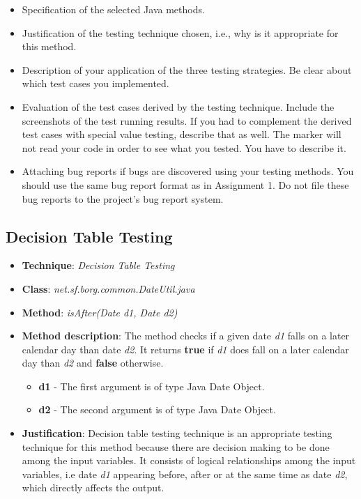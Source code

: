 \documentclass[fontsize=12pt,paper=letter,twoside]{scrartcl}
\begin{document}
\begin{itemize}
\item Specification of the selected Java methods.
\item Justification of the testing technique chosen, i.e., why is it appropriate for this method.
\item Description of your application of the three testing strategies. Be clear about which test cases
you implemented.
\item Evaluation of the test cases derived by the testing technique. Include the screenshots of the
test running results. If you had to complement the derived test cases with special value 
testing, describe that as well. The marker will not read your code in order to see what you
tested. You have to describe it.
\item Attaching bug reports if bugs are discovered using your testing methods. You should use the
same bug report format as in Assignment 1. Do not file these bug reports to the project’s bug
report system. 
\end{itemize}

\newpage
\subsection{Decision Table Testing}

\begin{itemize}
\item \textbf{Technique}: \emph{Decision Table Testing}
\item \textbf{Class}: \emph{net.sf.borg.common.DateUtil.java}
\item \textbf{Method}: \emph{isAfter(Date d1, Date d2)}
\item \textbf{Method description}: The method checks if a given date \emph{d1} falls on a later calendar day than date \emph{d2}. It returns \textbf{true} if \emph{d1} does fall on a later calendar day than \emph{d2} and \textbf{false} otherwise.
\begin{itemize}
\item \textbf{d1} - The first argument is of type Java Date Object.
\item \textbf{d2} - The second argument is of type Java Date Object.
\end{itemize}
\item \textbf{Justification}: Decision table testing technique is an appropriate testing technique for this method because there are decision making to be done among the input variables. It consists of logical relationships among the input variables, i.e date \emph{d1} appearing before, after or at the same time as date \emph{d2}, which directly affects the output.
\end{itemize}
\end{document}
